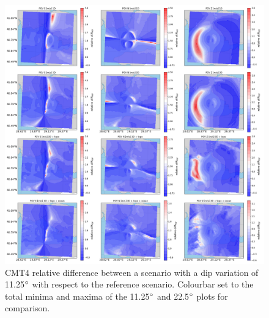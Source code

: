 \documentclass[../Text/00main.tex]{subfiles}
\begin{document}
\begin{figure}[!h]
    \centering
    \includegraphics[width=1\linewidth]{images_results/dip_variation_epsilon12_sc4.png}
    \caption{CMT4 relative difference between a scenario with a dip variation of 11.25$\degree$ with respect to the reference scenario. Colourbar set to the total minima and maxima of the 11.25$\degree$ and 22.5$\degree$ plots for comparison.}
    \label{fig:ref_eps12-2}
\end{figure}

\FloatBarrier
\end{document}
